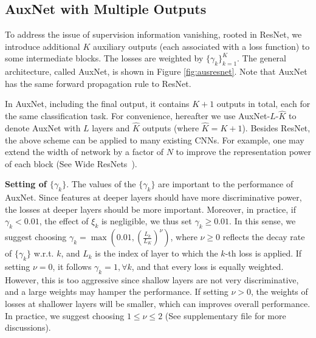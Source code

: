 \documentclass[10pt,onecolumn,letterpaper]{article}
\def\SexyName{AuxNet\xspace}
\begin{document}

\subsection{\SexyName with Multiple Outputs}
To address the issue of supervision information vanishing, rooted in ResNet, we introduce additional $K$ auxiliary outputs (each associated with a loss function) to some intermediate blocks. The losses are weighted by $\{\gamma_k\}_{k=1}^K$. The general architecture, called \SexyName, is shown in Figure \ref{fig:ausresnet}. Note that \SexyName has the same forward propagation rule to ResNet.


In \SexyName, including the final output, it contains $K+1$ outputs in total, each for the same classification task. For convenience, hereafter we use \SexyName-$L$-$\widehat{K}$ to denote \SexyName with $L$ layers and $\widehat{K}$ outputs (where $\widehat{K} = K+1$). Besides ResNet, the above scheme can be applied to many existing CNNs. For example, one may extend the width of network by a factor of $N$ to improve the representation power of each block (See Wide ResNets~\cite{zagoruyko2016wide}).



\textbf{{Setting of $\{\gamma_k\}$}}.
The values of the $\{\gamma_k\}$ are  important to the performance of \SexyName.  Since features at deeper layers should have more discriminative power, the losses at deeper layers should be more important. Moreover, in practice, if $\gamma_k<0.01$, the effect of $\xi_k$ is negligible, we thus set $\gamma_k \geq 0.01$. In this sense, we suggest choosing $\gamma_k = \max(0.01, (\frac{L_k}{L_K})^\nu)$, where $\nu\geq 0$ reflects the decay rate of $\{\gamma_k\}$ w.r.t. $k$, and $L_k$ is the index of layer to which the $k$-th loss is applied. If setting $\nu = 0$, it follows $\gamma_k = 1, \forall k$, and that every loss is equally weighted.  However, this is too aggressive since shallow layers are not very discriminative, and a large weights may hamper the performance. If setting $\nu > 0$, the weights of losses at shallower layers will be smaller, which can improves overall performance. In practice, we suggest choosing $1\leq \nu \leq 2$ (See supplementary file for more discussions).
\end{document}
